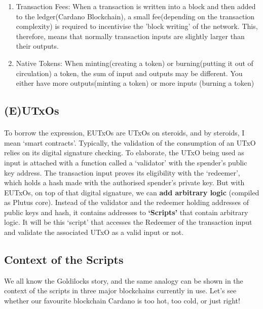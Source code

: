 \documentclass[a4paper, 11pt]{article}
\begin{document}
    \begin{enumerate}
        \item Transaction Fees: When a transaction is written into a block and then added to the ledger(Cardano Blockchain), a small fee(depending on the transaction complexity) is required to incentivise the 'block writing' of the network. This, therefore, means that normally transaction inputs are slightly larger than their outputs.
        \item Native Tokens: When minting(creating a token) or burning(putting it out of circulation) a token, the sum of input and outputs may be different. You either have more outputs(minting a token) or more inputs (burning a token)
    \end{enumerate}

    \subsection{(E)UTxOs}

    \paragraph{} To borrow the expression, EUTxOs are UTxOs on steroids, and by steroids, I mean `smart contracts'. Typically, the validation of the consumption of an UTxO relies on its digital signature checking. To elaborate, the UTxO being used as input is attached with a function called a `validator' with the spender's public key address. The transaction input proves its eligibility with the `redeemer', which holds a hash made with the authorised spender's private key.  But with EUTxOs, on top of that digital signature, we can \textbf{add arbitrary logic} (compiled as Plutus core). Instead of the validator and the redeemer holding addresses of public keys and hash, it contains addresses to \textbf{`Scripts'} that contain arbitrary logic. It will be this  `script' that accesses the Redeemer of the transaction input and validate the associated UTxO as a valid input or not. 

    \subsection{Context of the Scripts}
    We all know the Goldilocks story, and the same analogy can be shown in the context of the scripts in three major blockchains currently in use. Let's see whether our favourite blockchain Cardano is too hot, too cold, or just right!
\end{document}
